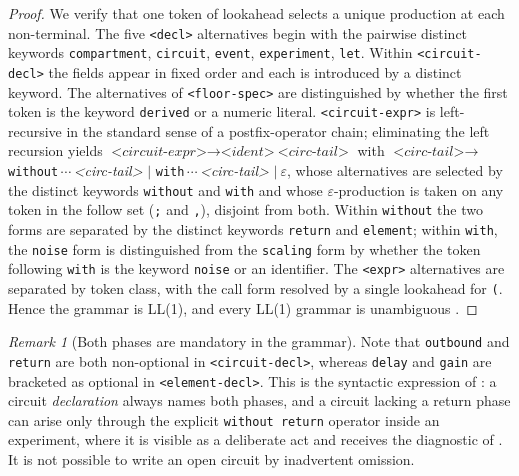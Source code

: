 \documentclass[11pt,twocolumn,a4paper]{article}
\theoremstyle{thmstyle}
\theoremstyle{definition}
\theoremstyle{remark}
\newtheorem{remark}[theorem]{Remark}
\begin{document}
\begin{proof}
We verify that one token of lookahead selects a unique production at each
non-terminal. The five \texttt{<decl>} alternatives begin with the pairwise
distinct keywords \texttt{compartment}, \texttt{circuit}, \texttt{event},
\texttt{experiment}, \texttt{let}. Within \texttt{<circuit-decl>} the fields
appear in fixed order and each is introduced by a distinct keyword. The
alternatives of \texttt{<floor-spec>} are distinguished by whether the first
token is the keyword \texttt{derived} or a numeric literal.
\texttt{<circuit-expr>} is left-recursive in the standard sense of a
postfix-operator chain; eliminating the left recursion yields
$\textit{<circuit-expr>}\to\textit{<ident>}\ \textit{<circ-tail>}$ with
$\textit{<circ-tail>}\to$ \texttt{without}\,$\cdots$\,\textit{<circ-tail>}
$\mid$ \texttt{with}\,$\cdots$\,\textit{<circ-tail>} $\mid\ \varepsilon$,
whose alternatives are selected by the distinct keywords \texttt{without} and
\texttt{with} and whose $\varepsilon$-production is taken on any token in the
follow set (\texttt{;} and \texttt{,}), disjoint from both. Within
\texttt{without} the two forms are separated by the distinct keywords
\texttt{return} and \texttt{element}; within \texttt{with}, the \texttt{noise}
form is distinguished from the \texttt{scaling} form by whether the token
following \texttt{with} is the keyword \texttt{noise} or an identifier. The
\texttt{<expr>} alternatives are separated by token class, with the call form
resolved by a single lookahead for \texttt{(}. Hence the grammar is LL(1), and
every LL(1) grammar is unambiguous \citep{aho2006}.
\end{proof}

\begin{remark}[Both phases are mandatory in the grammar]
\label{rem:mandatory-phases}
Note that \texttt{outbound} and \texttt{return} are both non-optional in
\texttt{<circuit-decl>}, whereas \texttt{delay} and \texttt{gain} are
bracketed as optional in \texttt{<element-decl>}. This is the syntactic
expression of : a circuit \emph{declaration} always
names both phases, and a circuit lacking a return phase can arise only through
the explicit \texttt{without return} operator inside an experiment, where it
is visible as a deliberate act and receives the diagnostic of
. It is not possible to write an open circuit by
inadvertent omission.
\end{remark}

\end{document}
